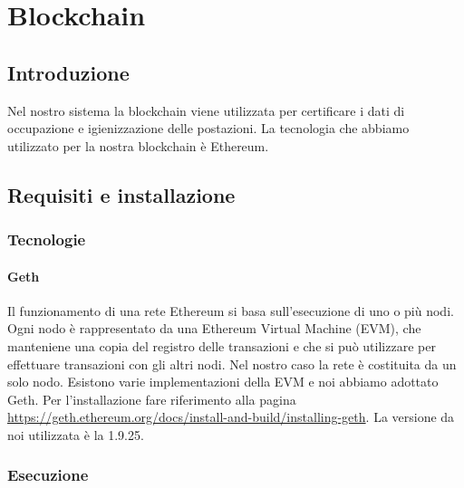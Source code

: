 \section{Blockchain}

\subsection{Introduzione}
Nel nostro sistema la blockchain viene utilizzata per certificare i dati di occupazione e igienizzazione delle postazioni. La tecnologia che abbiamo utilizzato per la nostra blockchain è Ethereum.

\subsection{Requisiti e installazione}

\subsubsection{Tecnologie}
\paragraph{Geth}
Il funzionamento di una rete Ethereum si basa sull'esecuzione di uno o più nodi. Ogni nodo è rappresentato da una Ethereum Virtual Machine (EVM), che manteniene una copia del registro delle transazioni e che si può utilizzare per effettuare transazioni con gli altri nodi. Nel nostro caso la rete è costituita da un solo nodo. Esistono varie implementazioni della EVM e noi abbiamo adottato Geth. \newline
Per l'installazione fare riferimento alla pagina \url{https://geth.ethereum.org/docs/install-and-build/installing-geth}. \newline
La versione da noi utilizzata è la 1.9.25.

\subsubsection{Esecuzione}

